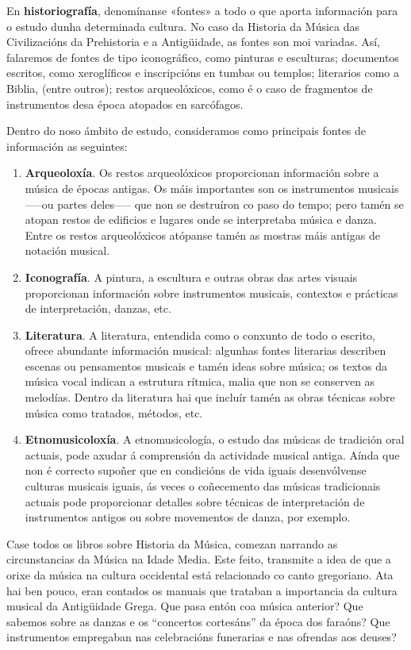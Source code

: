 \documentclass[a4paper, twoside]{templates/ociamthesis}
\providecommand{\tightlist}{%
  \setlength{\itemsep}{0pt}\setlength{\parskip}{0pt}}
\begin{document}
En \textbf{historiografía}, denomínanse «fontes» a todo o que aporta información para o estudo dunha determinada cultura. No caso da Historia da Música das Civilizacións da Prehistoria e a Antigüidade, as fontes son moi variadas. Así, falaremos de fontes de tipo iconográfico, como pinturas e esculturas; documentos escritos, como xeroglíficos e inscripcións en tumbas ou templos; literarios como a Biblia, (entre outros); restos arqueolóxicos, como é o caso de fragmentos de instrumentos desa época atopados en sarcófagos.

Dentro do noso ámbito de estudo, consideramos como principais fontes de información as seguintes:

\begin{enumerate}
\def\labelenumi{\arabic{enumi}.}
\tightlist
\item
  \textbf{Arqueoloxía}. Os restos arqueolóxicos proporcionan información sobre a música de épocas antigas. Os máis importantes son os instrumentos musicais -----ou partes deles----- que non se destruíron co paso do tempo; pero tamén se atopan restos de edificios e lugares onde se interpretaba música e danza. Entre os restos arqueolóxicos atópanse tamén as mostras máis antigas de notación musical.
\item
  \textbf{Iconografía}. A pintura, a escultura e outras obras das artes visuais proporcionan información sobre instrumentos musicais, contextos e prácticas de interpretación, danzas, etc.
\item
  \textbf{Literatura}. A literatura, entendida como o conxunto de todo o escrito, ofrece abundante información musical: algunhas fontes literarias describen escenas ou pensamentos musicais e tamén ideas sobre música; os textos da música vocal indican a estrutura rítmica, malia que non se conserven as melodías. Dentro da literatura hai que incluír tamén as obras técnicas sobre música como tratados, métodos, etc.
\item
  \textbf{Etnomusicoloxía}. A etnomusicología, o estudo das músicas de tradición oral actuais, pode axudar á comprensión da actividade musical antiga. Aínda que non é correcto supoñer que en condicións de vida iguais desenvólvense culturas musicais iguais, ás veces o coñecemento das músicas tradicionais actuais pode proporcionar detalles sobre técnicas de interpretación de instrumentos antigos ou sobre movementos de danza, por exemplo.
\end{enumerate}

Case todos os libros sobre Historia da Música, comezan narrando as circunstancias da Música na Idade Media. Este feito, transmite a idea de que a orixe da música na cultura occidental está relacionado co canto gregoriano. Ata hai ben pouco, eran contados os manuais que trataban a importancia da cultura musical da Antigüidade Grega. Que pasa entón coa música anterior? Que sabemos sobre as danzas e os ``concertos cortesáns'' da época dos faraóns? Que instrumentos empregaban nas celebracións funerarias e nas ofrendas aos deuses?
\end{document}
